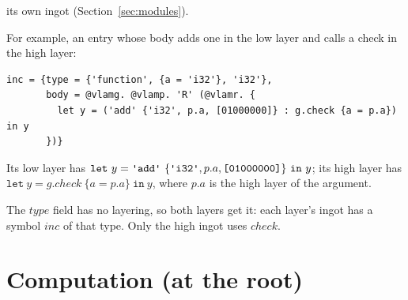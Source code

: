 \documentclass[11pt,letterpaper]{article}
\newcommand{\kw}[1]{\mathtt{#1}}
\newcommand{\str}[1]{\text{\ttfamily\textquotesingle #1\textquotesingle}}  %
\newcommand{\hex}[1]{\text{\ttfamily [#1]}}  %
\begin{document}
\begin{points}
\begin{subpoints}
    its own ingot (Section~\ref{sec:modules}).
  \end{subpoints}
\item\label{p:layer-example}For example, an entry whose body adds one in the low layer and calls a check
  in the high layer:
  \begin{Verbatim}[commandchars=\@\<\>, xleftmargin=2em]
inc = {type = {'function', {a = 'i32'}, 'i32'},
       body = @vlamg. @vlamp. 'R' (@vlamr. {
         let y = ('add' {'i32', p.a, [01000000]} : g.check {a = p.a}) in y
       })}
\end{Verbatim}
  \begin{subpoints}
  \item Its low layer has $\kw{let}\ y = \str{add}\ \{\str{i32}, p.a, \hex{01000000}\}\ \kw{in}\ y$; its high
    layer has $\kw{let}\ y = g.\mathit{check}\ \{a = p.a\}\ \kw{in}\ y$, where $p.a$ is the high layer of the
    argument.
  \item The $\mathit{type}$ field has no layering, so both layers get it: each layer's ingot has a
    symbol $\mathit{inc}$ of that type. Only the high ingot uses $\mathit{check}$.
  \end{subpoints}
\end{points}

\section{Computation (at the root)}\label{sec:computation}
\end{document}
